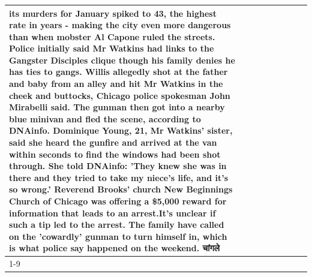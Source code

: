 \begin{table}[H]
\begin{tabular}{lllrlllll}
its murders for January spiked to 43, the highest rate in years - making the city even more dangerous than when mobster Al Capone ruled the streets. Police initially said Mr Watkins had links to the Gangster Disciples clique though his family denies he has ties to gangs. Willis allegedly shot at the father and baby from an alley and hit Mr Watkins in the cheek and buttocks, Chicago police spokesman John Mirabelli said. The gunman then got into a nearby blue minivan and fled the scene, according to DNAinfo. Dominique Young, 21, Mr Watkins' sister, said she heard the gunfire and arrived at the van within seconds to find the windows had been shot through. She told DNAinfo: 'They knew she was in there and they tried to take my niece's life, and it's so wrong.' Reverend Brooks' church New Beginnings Church of Chicago was offering a \$5,000 reward for information that leads to an arrest.It's unclear if such a tip led to the arrest. The family have called on the 'cowardly' gunman to turn himself in, which is what police say happened on the weekend. चांगले \\
\cline{1-9}

\end{tabular}
\end{table}
